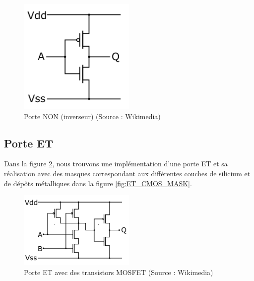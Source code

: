\documentclass[a4paper,11pt]{book}
\theoremstyle{definition}
\begin{document}
\begin{figure}
\centering
\includegraphics[width=0.5\textwidth]{media/ImplementationGates/220px-CMOS_Inverter.svg.png}
\caption{Porte NON (inverseur) (Source : Wikimedia)}
\label{fig:NOT_MOS}
\end{figure}

\subsection{Porte ET}
Dans la figure \ref{fig:ET_MOS}, nous trouvons une implémentation d'une porte ET et sa réalisation avec des masques correspondant aux différentes couches de silicium et de dépôts métalliques dans la figure \ref{fig:ET_CMOS_MASK}.

\begin{figure}
\centering
\includegraphics[width=0.5\textwidth]{media/ImplementationGates/CMOS_AND_Layout.svg.png}
\caption{Porte ET avec des transistors MOSFET (Source : Wikimedia)}
\label{fig:ET_MOS}
\end{figure}
\end{document}
